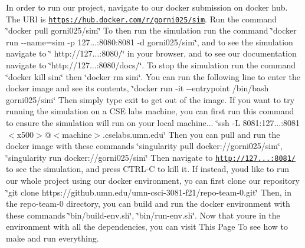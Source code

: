 In order to run our project, navigate to our docker submission on docker hub. The U\+Rl is \href{https://hub.docker.com/r/gorni025/sim}{\tt https\+://hub.\+docker.\+com/r/gorni025/sim}. Run the command \char`\"{}docker pull gorni025/sim\char`\"{} To then run the simulation run the command \char`\"{}docker run -\/-\/name=sim -\/p 127...\+:8080\+:8081 -\/d gorni025/sim\char`\"{}, and to see the simulation navigate to \char`\"{} http\+://127...\+:8080/\char`\"{} in your browser, and to see our documentation navigate to \char`\"{}http\+://127...\+:8080/docs/\char`\"{}. To stop the simulation run the command \char`\"{}docker kill sim\char`\"{} then \char`\"{}docker rm sim\char`\"{}. You can run the following line to enter the docker image and see it\textquotesingle{}s contents, \char`\"{}docker run -\/it -\/-\/entrypoint /bin/bash gorni025/sim\char`\"{} Then simply type exit to get out of the image. If you want to try running the simulation on a C\+SE labs machine, you can first run this command to ensure the simulation will run on your local machine... \char`\"{}ssh -\/\+L 8081\+:127...\+:8081 $<$x500$>$@$<$machine$>$.\+cselabs.\+umn.\+edu\char`\"{} Then you can pull and run the docker image with these commands \char`\"{}singularity pull docker\+://gorni025/sim\char`\"{}, \char`\"{}singularity run docker\+://gorni025/sim\char`\"{} Then navigate to \href{http://127.0.0.1:8081/}{\tt http\+://127...\+:8081/} to see the simulation, and press C\+T\+R\+L-\/C to kill it. If instead, you\textquotesingle{}d like to run our whole project using our docker environment, yo can first clone our repository \char`\"{}git clone https\+://github.\+umn.\+edu/umn-\/csci-\/3081-\/f21/repo-\/team-\/0.\+git\char`\"{} Then, in the repo-\/team-\/0 directory, you can build and run the docker environment with these commands \char`\"{}bin/build-\/env.\+sh\char`\"{}, \char`\"{}bin/run-\/env.\+sh\char`\"{}. Now that you\textquotesingle{}re in the environment with all the dependencies, you can visit This Page To see how to make and run everything. 